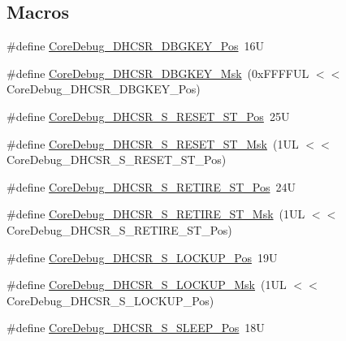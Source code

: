 \subsection*{Macros}
\begin{DoxyCompactItemize}
\item 
\#define \hyperlink{group___c_m_s_i_s___core_debug_gac91280edd0ce932665cf75a23d11d842}{Core\+Debug\+\_\+\+D\+H\+C\+S\+R\+\_\+\+D\+B\+G\+K\+E\+Y\+\_\+\+Pos}~16U
\item 
\#define \hyperlink{group___c_m_s_i_s___core_debug_ga1ce997cee15edaafe4aed77751816ffc}{Core\+Debug\+\_\+\+D\+H\+C\+S\+R\+\_\+\+D\+B\+G\+K\+E\+Y\+\_\+\+Msk}~(0x\+F\+F\+F\+F\+U\+L $<$$<$ Core\+Debug\+\_\+\+D\+H\+C\+S\+R\+\_\+\+D\+B\+G\+K\+E\+Y\+\_\+\+Pos)
\item 
\#define \hyperlink{group___c_m_s_i_s___core_debug_ga6f934c5427ea057394268e541fa97753}{Core\+Debug\+\_\+\+D\+H\+C\+S\+R\+\_\+\+S\+\_\+\+R\+E\+S\+E\+T\+\_\+\+S\+T\+\_\+\+Pos}~25U
\item 
\#define \hyperlink{group___c_m_s_i_s___core_debug_gac474394bcceb31a8e09566c90b3f8922}{Core\+Debug\+\_\+\+D\+H\+C\+S\+R\+\_\+\+S\+\_\+\+R\+E\+S\+E\+T\+\_\+\+S\+T\+\_\+\+Msk}~(1\+U\+L $<$$<$ Core\+Debug\+\_\+\+D\+H\+C\+S\+R\+\_\+\+S\+\_\+\+R\+E\+S\+E\+T\+\_\+\+S\+T\+\_\+\+Pos)
\item 
\#define \hyperlink{group___c_m_s_i_s___core_debug_ga2328118f8b3574c871a53605eb17e730}{Core\+Debug\+\_\+\+D\+H\+C\+S\+R\+\_\+\+S\+\_\+\+R\+E\+T\+I\+R\+E\+\_\+\+S\+T\+\_\+\+Pos}~24U
\item 
\#define \hyperlink{group___c_m_s_i_s___core_debug_ga89dceb5325f6bcb36a0473d65fbfcfa6}{Core\+Debug\+\_\+\+D\+H\+C\+S\+R\+\_\+\+S\+\_\+\+R\+E\+T\+I\+R\+E\+\_\+\+S\+T\+\_\+\+Msk}~(1\+U\+L $<$$<$ Core\+Debug\+\_\+\+D\+H\+C\+S\+R\+\_\+\+S\+\_\+\+R\+E\+T\+I\+R\+E\+\_\+\+S\+T\+\_\+\+Pos)
\item 
\#define \hyperlink{group___c_m_s_i_s___core_debug_ga2900dd56a988a4ed27ad664d5642807e}{Core\+Debug\+\_\+\+D\+H\+C\+S\+R\+\_\+\+S\+\_\+\+L\+O\+C\+K\+U\+P\+\_\+\+Pos}~19U
\item 
\#define \hyperlink{group___c_m_s_i_s___core_debug_ga7b67e4506d7f464ef5dafd6219739756}{Core\+Debug\+\_\+\+D\+H\+C\+S\+R\+\_\+\+S\+\_\+\+L\+O\+C\+K\+U\+P\+\_\+\+Msk}~(1\+U\+L $<$$<$ Core\+Debug\+\_\+\+D\+H\+C\+S\+R\+\_\+\+S\+\_\+\+L\+O\+C\+K\+U\+P\+\_\+\+Pos)
\item 
\#define \hyperlink{group___c_m_s_i_s___core_debug_ga349ccea33accc705595624c2d334fbcb}{Core\+Debug\+\_\+\+D\+H\+C\+S\+R\+\_\+\+S\+\_\+\+S\+L\+E\+E\+P\+\_\+\+Pos}~18U
\item 

\end{DoxyCompactItemize}
